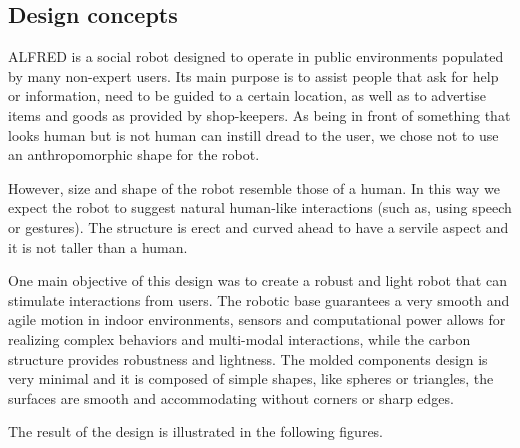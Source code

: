 \subsection{Design concepts}

ALFRED is a social robot designed to operate in public environments populated by many non-expert users.
Its main purpose is to assist people that ask for help or information, need to be guided to a certain
location, as well as to advertise items and goods as provided by shop-keepers.
As being in front of something that looks human but is not human can instill dread to the user, we chose not
to use an anthropomorphic shape for the robot.

However, size and shape of the robot resemble those of a human. In this way we expect the robot to suggest
natural human-like interactions (such as, using speech or gestures). The structure is erect and curved ahead to
have a servile aspect and it is not taller than a human.

One main objective of this design was to create a robust and light robot that can stimulate interactions from
users.
The robotic base guarantees a very smooth and agile motion in indoor environments, sensors and
computational power allows for realizing complex behaviors and multi-modal interactions, while the carbon
structure provides robustness and lightness.
The molded components design is very minimal and it is composed of simple shapes, like spheres or
triangles, the surfaces are smooth and accommodating without corners or sharp edges.

The result of the design is illustrated in the following figures.

